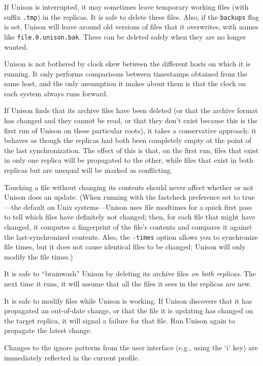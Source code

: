 \documentclass{article}
\begin{document}
If Unison is interrupted, it may sometimes leave temporary working files
(with suffix \verb|.tmp|) in the replicas.  It is safe to delete these
files.  Also, if the \verb|backups| flag is set, Unison will
leave around old versions of files that it overwrites, with names like
\verb|file.0.unison.bak|.  These can be deleted safely when they are no
longer wanted.

Unison is not bothered by clock skew between the different hosts on
which it is running.  It only performs comparisons between timestamps
obtained from the same host, and the only assumption it makes about
them is that the clock on each system always runs forward.

If Unison finds that its archive files have been deleted (or that the
archive format has changed and they cannot be read, or that they don't
exist because this is the first run of Unison on these particular
roots), it takes a conservative approach: it behaves as though the
replicas had both been completely empty at the point of the last
synchronization.  The effect of this is that, on the first run, files
that exist in only one replica will be propagated to the other, while
files that exist in both replicas but are unequal will be marked as
conflicting. 

Touching a file without changing its contents should never affect whether or
not Unison does an update. (When running with the fastcheck preference set
to true---the default on Unix systems---Unison uses file modtimes for a
quick first pass to tell which files have definitely not changed; then, for
each file that might have changed, it computes a fingerprint of the file's
contents and compares it against the last-synchronized contents. Also, the
\verb|-times| option allows you to synchronize file times, but it does not
cause identical files to be changed; Unison will only modify the file
times.)

It is safe to ``brainwash'' Unison by deleting its archive files
{\em on both replicas}.  The next time it runs, it will assume that
all the files it sees in the replicas are new.  

It is safe to modify files while Unison is working.  If Unison
discovers that it has propagated an out-of-date change, or that the
file it is updating has changed on the target replica, it will signal
a failure for that file.  Run Unison again to propagate the latest
change.

Changes to the ignore patterns from the user interface (e.g., using
the `i' key) are immediately reflected in the current profile.
\end{document}
